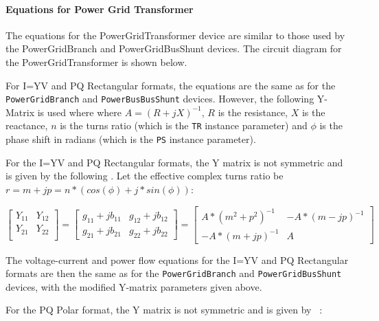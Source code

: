\paragraph{Equations for Power Grid Transformer}
The equations for the PowerGridTransformer device are similar to those used by the 
PowerGridBranch and PowerGridBusShunt devices.  The circuit diagram for the
PowerGridTransformer is shown below.

For I=YV and PQ Rectangular formats, the equations are the same as for the \texttt{PowerGridBranch}
and \texttt{PowerBusBusShunt} devices.  However, the following Y-Matrix is used where
where $A=(R+jX)^{-1}$, $R$ is the resistance, $X$ is the reactance, $n$ is the turns ratio (which is
the \texttt{TR} instance parameter) and $\phi$ is the phase shift in radians (which is 
the \texttt{PS} instance parameter).

For the I=YV and PQ Rectangular formats, the Y matrix is not symmetric and is given by the following
\cite{Kundur}. Let the effective complex turns ratio be $r = m + jp = n*(cos(\phi) + j*sin(\phi))$:

\begin{equation}
  \left[ \begin{array}{cc} 
         Y_{11} & Y_{12} \\ Y_{21} & Y_{22} \\  
         \end{array} \right] =
  \left[ \begin{array}{cc} 
         g_{11}+jb_{11} & g_{12}+jb_{12} \\  g_{21}+jb_{21} & g_{22}+jb_{22}
         \end{array} \right] =
  \left[ \begin{array}{cc} 
         A*(m^{2}+p^{2})^{-1} & -A*(m-jp)^{-1} \\ -A*(m+jp)^{-1} & A
         \end{array} \right]
\end{equation}

The voltage-current and power flow equations for the I=YV and PQ Rectangular formats
are then the same as for the \texttt{PowerGridBranch}
and \texttt{PowerGridBusShunt} devices, with the modified Y-matrix parameters given above.

For the PQ Polar format, the Y matrix is not symmetric and is given by ~\cite{Milano}:

